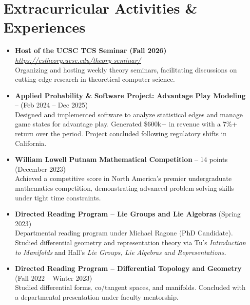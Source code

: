 \documentclass{curriculum-vitae}
\begin{document}
\section{Extracurricular Activities \& Experiences}
\begin{itemize}
  \item \textbf{Host of the UCSC TCS Seminar (Fall 2026)} \emph{\href{https://cstheory.ucsc.edu/theory-seminar/}{https://cstheory.ucsc.edu/theory-seminar/}}  \\
    Organizing and hosting weekly theory seminars, facilitating discussions on cutting-edge research in theoretical computer science.

  \item \textbf{Applied Probability \& Software Project: Advantage Play Modeling} -- (Feb 2024 -- Dec 2025)\\
    Designed and implemented software to analyze statistical edges and manage game states for advantage play. Generated \$600k+ in revenue with a 7\%+ return over the period. Project concluded following regulatory shifts in California.


  \item \textbf{William Lowell Putnam Mathematical Competition} -- 14 points (December 2023) \\
    Achieved a competitive score in North America's premier undergraduate mathematics competition, demonstrating advanced problem-solving skills under tight time constraints.


  \item \textbf{Directed Reading Program -- Lie Groups and Lie Algebras} (Spring 2023) \\
    Departmental reading program under Michael Ragone (PhD Candidate). Studied differential geometry and representation theory via Tu's \emph{Introduction to Manifolds} and Hall's \emph{Lie Groups, Lie Algebras and Representations}.

  \item \textbf{Directed Reading Program -- Differential Topology and Geometry} (Fall 2022 -- Winter 2023) \\
    Studied differential forms, co/tangent spaces, and manifolds. Concluded with a departmental presentation under faculty mentorship.


\end{itemize}
\end{document}
